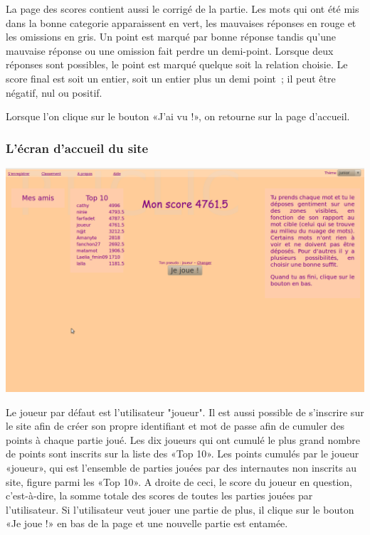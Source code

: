 \documentclass[a4paper,11pt,french]{article}
\begin{document}
La page des scores contient aussi le corrigé de la partie. Les mots qui ont été mis dans la bonne categorie apparaissent en vert, les
mauvaises réponses en rouge et les omissions en gris. Un point est marqué par bonne réponse tandis qu'une mauvaise réponse ou une omission
fait perdre un demi-point. Lorsque deux réponses sont possibles, le point est marqué quelque soit la relation choisie. Le score final est
soit un entier, soit un entier plus un demi point~; il peut être négatif, nul ou positif.

Lorsque l'on clique sur le bouton «J'ai vu !», on retourne sur la page d'accueil.

\subsubsection{L'écran d'accueil du site}
\begin{center}
\includegraphics[width=14cm]{img/PtiClicAccueil.png}
\end{center}

Le joueur par défaut est l'utilisateur "joueur". Il est aussi possible de s'inscrire sur le site afin de créer son propre identifiant et mot
de passe afin de cumuler des points à chaque partie joué. Les dix joueurs qui ont cumulé le plus grand nombre de points sont inscrits sur la
liste des «Top 10». Les points cumulés par le joueur «joueur», qui est l'ensemble de parties jouées par des internautes non inscrits au
site, figure parmi les «Top 10». A droite de ceci, le score du joueur en question, c'est-à-dire, la somme totale des scores de toutes les
parties jouées par l'utilisateur. Si l'utilisateur veut jouer une partie de plus, il clique sur le bouton «Je joue !» en bas de la page et
une nouvelle partie est entamée.
\end{document}

